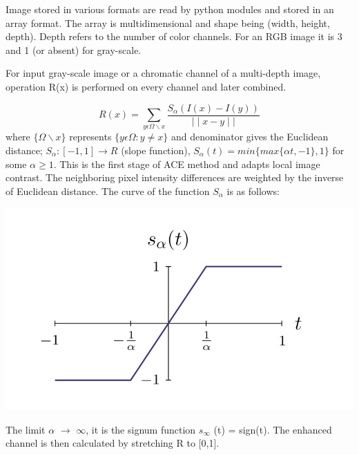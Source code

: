 \documentclass[12pt, a4paper, font = Times New Roman]{article}
\begin{document}
\par
Image stored in various formats are read by python modules and stored in an array format. The array is multidimensional and shape being (width, height, depth). Depth refers to the number of color channels. For an RGB image it is 3 and 1 (or absent) for gray-scale.
\par
For input gray-scale image or a chromatic channel of a multi-depth image, operation R(x) is performed on every channel and later combined.

\begin{equation}
R(x) = \sum_{y\epsilon \Omega \backslash x}{\frac{S_\alpha (I(x) - I(y))}{ \mid \mid x - y \mid \mid}}%
\end{equation}
where $\lbrace\Omega\backslash x\rbrace$ represents $\lbrace y \epsilon \Omega :y\neq x\rbrace$ and denominator gives the Euclidean distance; $S_\alpha : [-1, 1] \to R$ (slope function), $S_\alpha(t) = min\lbrace max\lbrace\alpha t, -1\rbrace, 1\rbrace$ for some $\alpha\geq 1$. 
This is the first stage of ACE method and adapts local image contrast. The neighboring pixel intensity differences are weighted by the inverse of Euclidean distance. The curve of the function $S_\alpha$ is as follows:


\begin{center}
\includegraphics[scale=0.5]{Capture.PNG}
\label{fig:slope_plot}
\end{center}

\par
The limit $\alpha$ $\rightarrow$ $\infty$, it is the signum function $s_\infty$ (t) = sign(t). The enhanced channel is then calculated by stretching R to [0,1].
\end{document}
